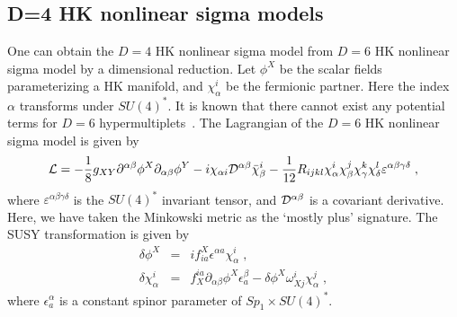 \documentclass[a4paper,12pt]{article}
\begin{document}
\subsection{D=4 HK nonlinear sigma models}
One can obtain the $D = 4$ HK nonlinear sigma model
from $D=6$ HK nonlinear sigma model by a dimensional reduction. 
Let $\phi^X$ be the scalar fields parameterizing a HK manifold,  
and $\chi^i_{\alpha}$ be the fermionic partner. 
Here the index ${\alpha}$ transforms under $SU(4)^*$. 
It is known that there cannot exist any potential terms for  
$D=6$ hypermultiplets~\cite{Sierra}. 
The Lagrangian of the $D = 6$ HK nonlinear sigma model 
is given by \cite{Sierra} 
\begin{eqnarray}
{\cal L}=-\frac{1}{8}g_{XY}\partial^{\alpha \beta}\phi^X
      \partial_{\alpha \beta}\phi^Y
     -i\chi_{\alpha i} {\cal D}^{\alpha \beta} \bar{\chi}^i_\beta
     - \frac{1}{12}R_{ijkl}\chi^i_\alpha \chi^j_\beta 
       \chi^k_\gamma \chi^l_\delta 
       \varepsilon ^{\alpha \beta \gamma \delta}\;,
\end{eqnarray}
where $\varepsilon ^{\alpha \beta \gamma \delta}$ is 
the $SU(4)^*$ invariant tensor, 
and ${\cal D}^{\alpha \beta}$ is a covariant derivative. 
Here, we have taken the Minkowski metric 
as the `mostly plus' signature.
The SUSY transformation is given by
\begin{eqnarray}
 \delta \phi^X 
  &=& if^X_{ia}\epsilon ^{\alpha a}\chi ^i_\alpha \;,\\
 \delta \chi^i_\alpha 
  &=& f_X^{ia}\partial_{\alpha \beta}\phi^X \epsilon^\beta_a
     - \delta\phi^X\omega_{Xj}^i \chi^j_\alpha \;, 
\end{eqnarray}
where $\epsilon^\alpha_a$ is a constant spinor parameter 
of $Sp_1 \times SU(4)^*$. 
\end{document}
